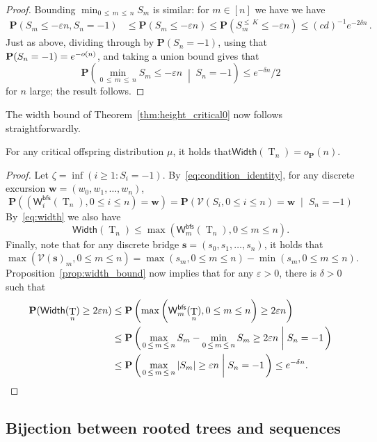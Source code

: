 \documentclass[10pt]{amsart}
\theoremstyle{definition}\newtheorem{defi}[theo]{Definition}\newtheorem{rema}[theo]{Remark}\newtheorem{exam}[theo]{Example}\newtheorem{exem}[theo]{Example}\newtheorem{nota}[theo]{Notation}
\newcommand*\W{\mathsf{W}}
\newcommand{\bfs}{\mathsf{bfs}}
\newcommand{\p}{\mathbf{P}}
\newcommand{\bfw}{\mathbf{w}}
\newcommand{\bffs}{\mathbf{s}}
\newcommand{\Width}{\mathsf{Width}}
\DeclareMathOperator{\rtree}{T}
\newcommand{\cV}{\mathcal{V}}
\newcommand{\set}[1]{\left(#1 \right)}
\newcommand{\Cprob}[2]{\mathbf{P}\set{\left. #1 \; \middle| \; #2\right.}}
\newcommand{\probC}[2]{\mathbf{P}\set{\left. #1 \; \middle| \; #2 \right. }}
\providecommand{\eps}{}
\renewcommand{\eps}{\varepsilon}
\begin{document}
\begin{proof}
Bounding $\min_{0\, \le\,m\,\le\,n} S_m$ is similar: for $m \in [n]$ we have we have
\begin{align*}
\p(S_m \le -\eps n,S_n=-1) & \le \p(S_m \le -\eps n) \le
\p\left(S_m^{\le\,K} \le -\eps n\right)
\le (cd)^{-1} e^{-2\delta n}\,.
\end{align*}
Just as above, dividing through by $\p(S_n=-1)$, using that $\p(S_n = -1)\linebreak = e^{-o(n)}$, and taking a union bound gives that
\[
\probC{\min_{0\,\le\,m\,\le\,n} S_m \le -\eps n}{S_n=-1}
\le e^{-\delta n}/2
\]
for $n$ large; the result follows.
\end{proof}

The width bound of Theorem~\ref{thm:height_critical0} now follows straightforwardly.
\begin{coro}\label{cor:width_bound}
For any critical offspring distribution $\mu$, it holds that\linebreak $\Width(\rtree_n)=o_{\p}(n)$.
\end{coro}
\begin{proof}
Let $\zeta=\inf(i \ge 1: S_i=-1)$. By~\eqref{eq:condition_identity}, for any discrete excursion $\bfw=(w_0,w_1,\ldots,w_n)$,
\[
\p\left(\left(\W^{\bfs}_{i}(\rtree_n),0 \le i \le n\right)=\bfw\right) =
\Cprob{\cV(S_i,0 \le i \le n)=\bfw}{S_n=-1}
\]
By~\eqref{eq:width} we also have
\[
\Width(\rtree_n) \leq \max \left(\W^{\bfs}_m(\rtree_n),0 \le m \le n\right).
\]
Finally, note that for any discrete bridge $\bffs=(s_0,s_1,\ldots,s_n)$, it holds that
\[
\max(\cV(\bffs)_m,0 \le m \le n) = \max(s_m,0 \le m \le n)-\min(s_m,0 \le m \le n).
\]
Proposition~\ref{prop:width_bound} now implies that for any $\eps > 0$, there is $\delta > 0$ such that
\begin{align*}
\p(\Width(\rtree_n) \ge 2\eps n) & \le \p\left(\max \left(\W^{\bfs}_m(\rtree_n),0 \le m \le n\right) \ge 2\eps n\right) \\
& \le \Cprob{\max_{0\, \le\,m \,\le\,n} S_m-\min_{0\,\le\,m\,\le\,n} S_m\ge 2\eps n}{S_n=-1} \\
& \le \Cprob{\max_{0\,\le\,m\,\le\,n} |S_m| \ge\eps n}{S_n=-1} \le e^{-\delta n}. \qedhere
\end{align*}
\end{proof}


\subsection{Bijection between rooted trees and sequences}
\end{document}
